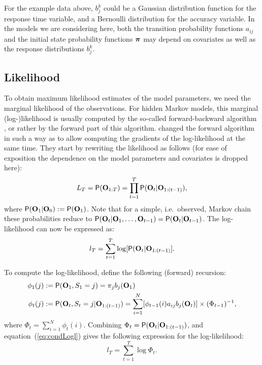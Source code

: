 \documentclass[article]{jss}
\newcommand{\vc}{\mathbf}
\newcommand{\greekv}[1]{\mbox{\boldmath$\mathrm{#1}$}}
\begin{document}
For the example data above, $b_j^k$ could be a Gaussian distribution
function for the response time variable, and a Bernoulli distribution
for the accuracy variable.  In the models we are considering here,
both the transition probability functions $a_{ij}$ and the initial
state probability functions $\greekv{\pi}$ may depend on covariates as
well as the response distributions $b_{j}^{k}$.

\subsection{Likelihood}

To obtain maximum likelihood estimates of the model parameters, we
need the marginal likelihood of the observations.  For hidden Markov
models, this marginal (log-)likelihood is usually computed by the
so-called forward-backward algorithm \citep{Baum1966,Rabiner1989}, or
rather by the forward part of this algorithm.  \cite{Lystig2002}
changed the forward algorithm in such a way as to allow computing the
gradients of the log-likelihood at the same time.  They start by
rewriting the likelihood as follows (for ease of exposition the
dependence on the model parameters and covariates is dropped here):
\begin{equation}
	L_{T} = \Prob(\vc{O}_{1:T}) = \prod_{t=1}^{T} 
	\Prob(\vc{O}_{t}|\vc{O}_{1:(t-1)}), 
	\label{condLike}
\end{equation}
where $\Prob(\vc{O}_{1}|\vc{O}_{0}):=\Prob(\vc{O}_{1})$. Note that for a 
simple, i.e.\ observed, Markov chain these probabilities reduce to 
$\Prob(\vc{O}_{t}|\vc{O}_{1},\ldots, 
\vc{O}_{t-1})=\Prob(\vc{O}_{t}|\vc{O}_{t-1})$.
The log-likelihood can now be expressed as:
\begin{equation}
	l_{T} = \sum_{t=1}^{T} \log[\Prob(\vc{O}_{t}|\vc{O}_{1:(t-1)}].
	\label{eq:condLogl}
\end{equation}

To compute the log-likelihood, \cite{Lystig2002} define the following 
(forward) recursion:
\begin{align}
	\phi_{1}(j) &:= \Prob(\vc{O}_{1}, S_{1}=j) = \pi_{j} b_{j}(\vc{O}_{1}) 
	\label{eq:fwd1} \\
	\phi_{t}(j) &:= \Prob(\vc{O}_{t}, S_{t}=j|\vc{O}_{1:(t-1)}) %
	= \sum_{i=1}^{N} [\phi_{t-1}(i)a_{ij}b_{j}(\vc{O}_{t})] \times 
(\Phi_{t-1})^{-1},
	\label{eq:fwdt} 
\end{align}
where $\Phi_{t}=\sum_{i=1}^{N} \phi_{t}(i)$. Combining 
$\Phi_{t}=\Prob(\vc{O}_{t}|\vc{O}_{1:(t-1)})$, and 
equation~(\ref{eq:condLogl}) gives the following expression for the 
log-likelihood:
\begin{equation}
	l_{T} = \sum_{t=1}^{T} \log \Phi_{t}.
	\label{eq:logl}
\end{equation}
\end{document}
